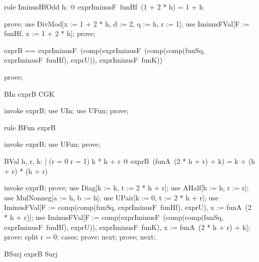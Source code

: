 \documentclass{article}
\begin{document}
\begin{theorem}{rule IminusHfOdd}
  \forall h: \nat @ exprIminusF~funHf~(1 + 2 * h) = 1 + h
\end{theorem}

\begin{zproof}
prove;
use DivMod[x := 1 + 2 * h, d := 2, q := h, r := 1];
use IminusFVal[F := funHf, x := 1 + 2 * h];
prove;
\end{zproof}

\begin{zed}
  exprB == exprIminusF~(comp(exprIminusF~(comp(comp(funSq, exprIminusF~funHf), exprU)), exprIminusF~funK))
\end{zed}

\begin{zproof}
prove;
\end{zproof}

\begin{theorem}{BIn}
  exprB \in CGK
\end{theorem}

\begin{zproof}
invoke exprB;
use UIn;
use UFun;
prove;
\end{zproof}

\begin{theorem}{rule BFun}
  exprB \in \nat \fun \nat
\end{theorem}

\begin{zproof}
invoke exprB;
use UFun;
prove;
\end{zproof}

\begin{theorem}{BVal}
  \forall h, r, k: \nat | (r = 0 \lor r = 1) \land k  * h + r @ exprB~(funA~(2 * h + r) + k) = k + (h + r) * (h + r)
\end{theorem}

\begin{zproof}
invoke exprB;
prove;
use Diag[k := k, t := 2 * h + r];
use AHalf[h := h, r := r];
use MulNonneg[a := h, b := h];
use UPair[k := 0, t := 2 * h + r];
use IminusFVal[F := comp(comp(funSq, exprIminusF~funHf), exprU), x := funA~(2 * h + r)];
use IminusFVal[F := comp(exprIminusF~(comp(comp(funSq, exprIminusF~funHf), exprU)), exprIminusF~funK), x := funA~(2 * h + r) + k];
prove;
split r = 0;
cases;
prove;
next;
prove;
next;
\end{zproof}

\begin{theorem}{BSurj}
  exprB \in Surj
\end{theorem}
\end{document}
